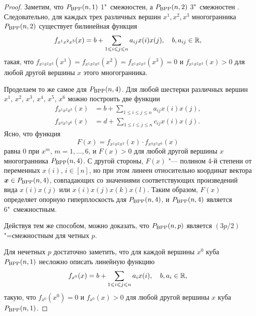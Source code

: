 \begin{proof}
Заметим, что $P_{\textup{BPP}}(n,1)$ 1"~смежностен, а $P_{\textup{BPP}}(n,2)$ 3"~смежностен \cite{Deza:1992}.
Следовательно, для каждых трех различных вершин 
$x^1, x^2, x^3$ многогранника $P_{\textup{BPP}}(n,2)$ существует билинейная функция 
\begin{equation*}
f_{x^1 x^2 x^3}(x) = b + \sum_{1\leqslant i \leqslant j \leqslant n} a_{ij} x(i) x(j), \quad b, a_{ij} \in \mathbb{R},
\end{equation*}
такая, что $f_{x^1 x^2 x^3}(x^1) = f_{x^1 x^2 x^3}(x^2) = f_{x^1 x^2 x^3}(x^3) = 0$ 
и $f_{x^1 x^2 x^3}(x) > 0$ для любой другой вершины $x$ этого многогранника.
	
Проделаем то же самое для $P_{\textup{BPP}}(n,4)$.
Для любой шестерки различных вершин $x^1$, $x^2$, $x^3$, $x^4$, $x^5$, $x^6$ можно построить две функции
\begin{equation*}
\begin{aligned}
f_{x^1 x^2 x^3}(x) &= b + \sum_{1\le i \le j \le n} a_{ij} x(i)x(j),\\
f_{x^4 x^5 x^6}(x) &= d + \sum_{1\le i \le j \le n} c_{ij} x(i)x(j).
\end{aligned}
\end{equation*}
Ясно, что функция
\[
F(x) = f_{x^1 x^2 x^3}(x) \cdot f_{x^4 x^5 x^6}(x)
\]
равна 0 при $x^m$, $m = 1, \ldots, 6$, и $F(x) > 0$ для любой другой вершины $x$ многогранника $P_{\textup{BPP}}(n,4)$.
С другой стороны, $F(x)$ "--- полином 4-й степени от переменных $x(i)$, $i \in [n]$,
но при этом линеен относительно координат вектора $\bm{x} \in P_{\textup{BPP}}(n,4)$, совпадающих со значениями соответствующих произведений вида $x(i)x(j)$ или $x(i)x(j)x(k)x(l)$.
Таким образом, $F(x)$ определяет опорную гиперплоскость для $P_{\textup{BPP}}(n,4)$, и $P_{\textup{BPP}}(n,4)$ является 6"~смежностным.
	
Действуя тем же способом, можно доказать, что $P_{\textup{BPP}}(n,p)$ является $(3p/2)$"=смежностным для четных $p$.
	
Для нечетных $p$ достаточно заметить, что для каждой вершины $x^0$ куба $P_{\textup{BPP}}(n,1)$	несложно описать линейную функцию 
\begin{equation*}
f_{x^0}(x) = b + \sum_{1\leqslant i \leqslant j \leqslant n} a_i x(i), \quad b, a_i \in \mathbb{R},
\end{equation*}
такую, что $f_{x^0}(x^0) = 0$ и $f_{x^0}(x) > 0$ для любой другой вершины $x$ куба $P_{\textup{BPP}}(n,1)$.
\end{proof}


